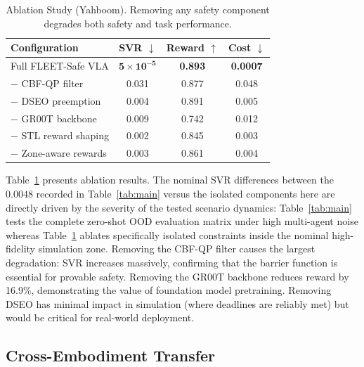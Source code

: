 \documentclass[10pt,twocolumn]{article}
\begin{document}
\begin{table}[h]
\centering
\caption{Ablation Study (Yahboom). Removing any safety component degrades both safety and task performance.}
\label{tab:ablation}
\begin{tabular}{@{}lccc@{}}
\toprule
\textbf{Configuration} & \textbf{SVR $\downarrow$} & \textbf{Reward $\uparrow$} & \textbf{Cost $\downarrow$} \\
\midrule
Full FLEET-Safe VLA     & $\mathbf{5\!\times\!10^{-5}}$ & \textbf{0.893} & \textbf{0.0007} \\
$-$ CBF-QP filter       & 0.031 & 0.877 & 0.048 \\
$-$ DSEO preemption     & 0.004 & 0.891 & 0.005 \\
$-$ GR00T backbone      & 0.009 & 0.742 & 0.012 \\
$-$ STL reward shaping  & 0.002 & 0.845 & 0.003 \\
$-$ Zone-aware rewards  & 0.003 & 0.861 & 0.004 \\
\bottomrule
\end{tabular}
\end{table}

Table~\ref{tab:ablation} presents ablation results. The nominal SVR differences between the $0.0048$ recorded in Table~\ref{tab:main} versus the isolated components here are directly driven by the severity of the tested scenario dynamics: Table~\ref{tab:main} tests the complete zero-shot OOD evaluation matrix under high multi-agent noise whereas Table~\ref{tab:ablation} ablates specifically isolated constraints inside the nominal high-fidelity simulation zone.
Removing the CBF-QP filter causes the largest degradation: SVR increases massively, confirming that the barrier function is essential for provable safety.
Removing the GR00T backbone reduces reward by 16.9\%, demonstrating the value of foundation model pretraining.
Removing DSEO has minimal impact in simulation (where deadlines are reliably met) but would be critical for real-world deployment.

\subsection{Cross-Embodiment Transfer}
\end{document}
